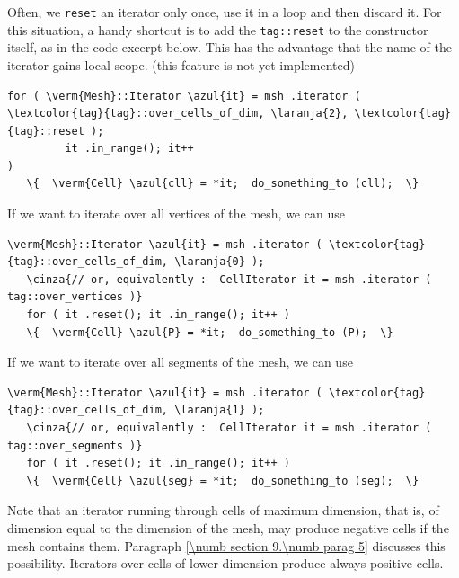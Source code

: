 Often, we {\small\tt reset} an iterator only once, use it in a loop and then discard it.
For this situation, a handy shortcut is to add the {\small\tt\textcolor{tag}{tag}::reset}
to the constructor itself, as in the code excerpt below.
This has the advantage that the name of the iterator gains local scope.
(this feature is not yet implemented)

\begin{Verbatim}[commandchars=\\\{\},formatcom=\small\tt,
   baselinestretch=0.94,framesep=2mm                      ]
   for ( \verm{Mesh}::Iterator \azul{it} = msh .iterator ( \textcolor{tag}{tag}::over_cells_of_dim, \laranja{2}, \textcolor{tag}{tag}::reset );
         it .in_range(); it++                                                        )
   \{  \verm{Cell} \azul{cll} = *it;  do_something_to (cll);  \}
\end{Verbatim}

If we want to iterate over all vertices of the mesh, we can use

\begin{Verbatim}[commandchars=\\\{\},formatcom=\small\tt,
   baselinestretch=0.94,framesep=2mm                      ]
   \verm{Mesh}::Iterator \azul{it} = msh .iterator ( \textcolor{tag}{tag}::over_cells_of_dim, \laranja{0} );
   \cinza{// or, equivalently :  CellIterator it = msh .iterator ( tag::over_vertices )}
   for ( it .reset(); it .in_range(); it++ )
   \{  \verm{Cell} \azul{P} = *it;  do_something_to (P);  \}
\end{Verbatim}

If we want to iterate over all segments of the mesh, we can use

\begin{Verbatim}[commandchars=\\\{\},formatcom=\small\tt,
   baselinestretch=0.94,framesep=2mm                      ]
   \verm{Mesh}::Iterator \azul{it} = msh .iterator ( \textcolor{tag}{tag}::over_cells_of_dim, \laranja{1} );
   \cinza{// or, equivalently :  CellIterator it = msh .iterator ( tag::over_segments )}
   for ( it .reset(); it .in_range(); it++ )
   \{  \verm{Cell} \azul{seg} = *it;  do_something_to (seg);  \}
\end{Verbatim}

Note that an iterator running through cells of maximum dimension, that is, of dimension equal
to the dimension of the mesh, may produce negative cells if the mesh contains them.
Paragraph \ref{\numb section 9.\numb parag 5} discusses this possibility.
Iterators over cells of lower dimension produce always positive cells.

